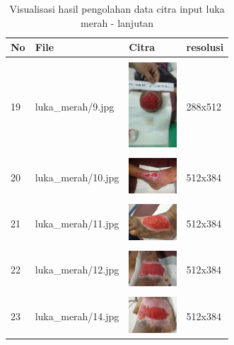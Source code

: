 \begin{table}[H]
	\centering
	\caption{Visualisasi hasil pengolahan data citra input luka merah - lanjutan}
	\label{tabel_input_10}
	\begin{tabular}{|m{0.2in}|m{1.2in}|m{0.7in}|m{0.7in}|}
		\hline
		\textbf{No} & \textbf{File} & \textbf{Citra} & \textbf{resolusi} \\
		\hline
			
		& &  &  \\
		19& 
		luka\_merah/9.jpg &
		\includegraphics[width=0.7in]{gambar/dataset_citra/luka_merah/bahan/9.jpg}&
		288x512\\
		\hline
		
		& &  &  \\
		20& 
		luka\_merah/10.jpg &
		\includegraphics[width=0.7in]{gambar/dataset_citra/luka_merah/bahan/10.jpg}&
		512x384\\
		\hline
		
		& &  &  \\
		21& 
		luka\_merah/11.jpg &
		\includegraphics[width=0.7in]{gambar/dataset_citra/luka_merah/bahan/11.jpg}&
		512x384\\
		\hline

		& &  &  \\
		22 & 
		luka\_merah/12.jpg &
		\includegraphics[width=0.7in]{gambar/dataset_citra/luka_merah/bahan/12.jpg}&
		512x384\\
		\hline
		
		& &  &  \\
		23& 
		luka\_merah/14.jpg &
		\includegraphics[width=0.7in]{gambar/dataset_citra/luka_merah/bahan/14.jpg}&
		512x384\\
		\hline
		

\end{tabular}
\end{table}
